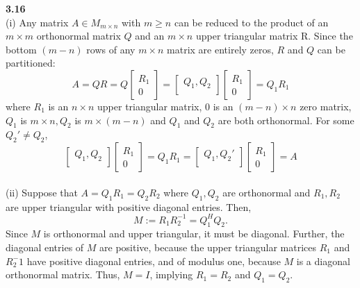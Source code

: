 \documentclass[letterpaper,12pt]{article}
\theoremstyle{definition}
\begin{document}
\noindent\textbf{3.16}\\
(i) Any matrix $A \in M_{m \times n}$ with $m \geq n$ can be reduced to the product of an $m \times m$ orthonormal matrix $Q$ and an $m \times n$ upper triangular matrix R. Since the bottom $(m-n)$ rows of any $m \times n$ matrix are entirely zeros, $R$ and $Q$ can be partitioned:
\begin{equation*}
A = QR = Q \begin{bmatrix}
	R_1 \\
	0 
\end{bmatrix}
= \begin{bmatrix}
	Q_1, Q_2 \\
\end{bmatrix}
\begin{bmatrix}
	R_1 \\
	0
\end{bmatrix}
= Q_1R_1
\end{equation*}
where $R_1$ is an $n \times n$ upper triangular matrix, $0$ is an $(m-n)\times n$ zero matrix, $Q_1$ is $m \times n, Q_2$ is $m \times (m-n)$ and $Q_1$ and $Q_2$ are both orthonormal. For some $Q_2' \neq Q_2$,
\begin{equation*}
\begin{bmatrix}
	Q_1, Q_2 \\
\end{bmatrix}
\begin{bmatrix}
	R_1 \\
	0
\end{bmatrix}
= Q_1R_1 = 
\begin{bmatrix}
	Q_1, Q_2' \\
\end{bmatrix}
\begin{bmatrix}
	R_1 \\
	0
\end{bmatrix}
= A
\end{equation*}\\

\noindent(ii) Suppose that $A = Q_1R_1 = Q_2R_2$ where $Q_1,Q_2$ are orthonormal and $R_1, R_2$ are upper triangular with positive diagonal entries. Then,
\begin{equation*}
M:=R_1R_2^{-1} = Q_1^HQ_2.
\end{equation*}
Since $M$ is orthonormal and upper triangular, it must be diagonal. Further, the diagonal entries of $M$ are positive, because the upper triangular matrices $R_1$ and $R_2^-1$ have positive diagonal entries, and of modulus one, because $M$ is a diagonal orthonormal matrix. Thus, $M=I$, implying $R_1 = R_2$ and $Q_1 = Q_2$.\\
\end{document}
